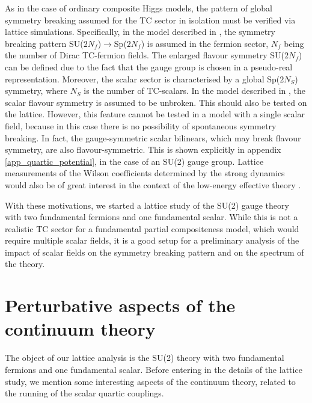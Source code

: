 As in the case of ordinary composite Higgs models, the pattern of global symmetry breaking assumed for the TC sector in isolation must be verified via lattice simulations. Specifically, in the model described in \cite{Cacciapaglia:2017cdi}, the symmetry breaking pattern SU($2N_f$)$\to$Sp($2N_f$) is assumed in the fermion sector, $N_f$ being the number of Dirac TC-fermion fields. The enlarged flavour symmetry SU($2N_f$) can be defined due to the fact that the gauge group is chosen in a pseudo-real representation. Moreover, the scalar sector is characterised by a global Sp($2N_S$) symmetry, where $N_S$ is the number of TC-scalars. In the model described in \cite{Cacciapaglia:2017cdi}, the scalar flavour symmetry is assumed to be unbroken. This should also be tested on the lattice. However, this feature cannot be tested in a model with a single scalar field, because in this case there is no possibility of spontaneous symmetry breaking. In fact, the gauge-symmetric scalar bilinears, which may break flavour symmetry, are also flavour-symmetric. This is shown explicitly in appendix \ref{app_quartic_potential}, in the case of an SU(2) gauge group. Lattice measurements of the Wilson coefficients determined by the strong dynamics would also be of great interest in the context of the low-energy effective  theory \cite{Cacciapaglia:2017cdi}. 

With these motivations, we started a lattice study of the SU(2) gauge theory with two fundamental fermions and one fundamental scalar. While this is not a realistic TC sector for a fundamental partial compositeness model, which would require multiple scalar fields, it is a good setup for a preliminary analysis of the impact of scalar fields on the symmetry breaking pattern and on the spectrum of the theory.



\section{Perturbative aspects of the continuum theory}
\label{running_lambda}

The object of our lattice analysis is the SU(2) theory with two fundamental fermions and one fundamental scalar. Before entering in the details of the lattice study, we mention some  interesting aspects of the continuum theory, related to the running of the scalar quartic couplings. 

